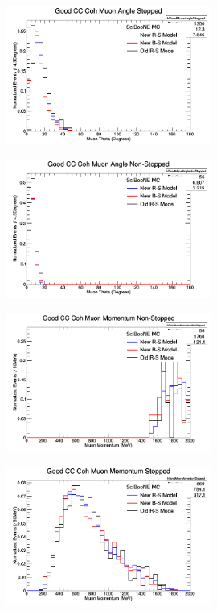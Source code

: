 \documentclass[11pt]{article}
\begin{document}
\begin{figure}[H]
\centering
\includegraphics[width=0.6\textwidth]{NMCombinedPlotsImages/10-NMCombinedPlots.png}
\caption{}
\end{figure}

\begin{figure}[H]
\centering
\includegraphics[width=0.6\textwidth]{NMCombinedPlotsImages/11-NMCombinedPlots.png}
\caption{}
\end{figure}

\begin{figure}[H]
\centering
\includegraphics[width=0.6\textwidth]{NMCombinedPlotsImages/12-NMCombinedPlots.png}
\caption{}
\end{figure}

\begin{figure}[H]
\centering
\includegraphics[width=0.6\textwidth]{NMCombinedPlotsImages/13-NMCombinedPlots.png}
\caption{}
\end{figure}
\end{document}
